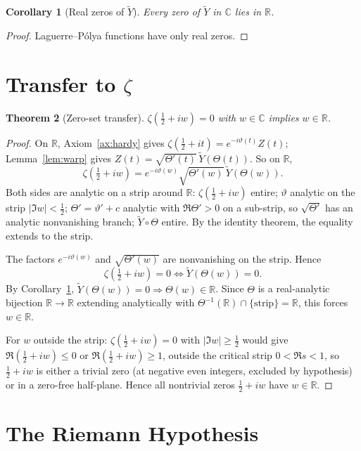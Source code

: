 \documentclass[11pt]{article}
\newtheorem{theorem}{Theorem}
\newtheorem{corollary}[theorem]{Corollary}
\theoremstyle{definition}
\newcommand{\R}{\mathbb{R}}
\newcommand{\C}{\mathbb{C}}
\begin{document}
\begin{corollary}[Real zeros of \(\tilde Y\)]\label{cor:realzeros}
Every zero of \(\tilde Y\) in \(\C\) lies in \(\R\).
\end{corollary}

\begin{proof}
Laguerre--P\'olya functions have only real zeros.
\end{proof}

\section{Transfer to \(\zeta\)}

\begin{theorem}[Zero-set transfer]\label{thm:transfer}
\(\zeta(\tfrac12+iw)=0\) with \(w\in\C\) implies \(w\in\R\).
\end{theorem}

\begin{proof}
On \(\R\), Axiom~\ref{ax:hardy} gives \(\zeta(\tfrac12+it)=e^{-i\vartheta(t)}Z(t)\); Lemma~\ref{lem:warp} gives \(Z(t)=\sqrt{\Theta'(t)}\,\tilde Y(\Theta(t))\). So on \(\R\),
\[
\zeta(\tfrac12+iw)=e^{-i\vartheta(w)}\sqrt{\Theta'(w)}\,\tilde Y(\Theta(w)).
\]
Both sides are analytic on a strip around \(\R\): \(\zeta(\tfrac12+iw)\) entire; \(\vartheta\) analytic on the strip \(|\Im w|<\tfrac12\); \(\Theta'=\vartheta'+c\) analytic with \(\Re\Theta'>0\) on a sub-strip, so \(\sqrt{\Theta'}\) has an analytic nonvanishing branch; \(\tilde Y\circ\Theta\) entire. By the identity theorem, the equality extends to the strip.

The factors \(e^{-i\vartheta(w)}\) and \(\sqrt{\Theta'(w)}\) are nonvanishing on the strip. Hence
\[
\zeta(\tfrac12+iw)=0\iff\tilde Y(\Theta(w))=0.
\]
By Corollary~\ref{cor:realzeros}, \(\tilde Y(\Theta(w))=0\Rightarrow\Theta(w)\in\R\). Since \(\Theta\) is a real-analytic bijection \(\R\to\R\) extending analytically with \(\Theta^{-1}(\R)\cap\{\text{strip}\}=\R\), this forces \(w\in\R\).

For \(w\) outside the strip: \(\zeta(\tfrac12+iw)=0\) with \(|\Im w|\ge\tfrac12\) would give \(\Re(\tfrac12+iw)\le 0\) or \(\Re(\tfrac12+iw)\ge 1\), outside the critical strip \(0<\Re s<1\), so \(\tfrac12+iw\) is either a trivial zero (at negative even integers, excluded by hypothesis) or in a zero-free half-plane. Hence all nontrivial zeros \(\tfrac12+iw\) have \(w\in\R\).
\end{proof}

\section{The Riemann Hypothesis}
\end{document}
